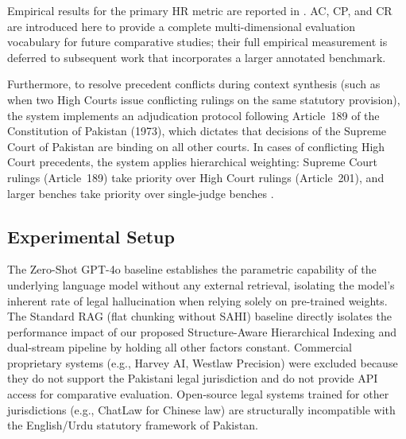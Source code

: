 Empirical results for the primary HR metric are reported in . AC, CP,
and CR are introduced here to provide a complete multi-dimensional evaluation vocabulary
for future comparative studies; their full empirical measurement is deferred to
subsequent work that incorporates a larger annotated benchmark.

Furthermore, to resolve precedent conflicts during context synthesis (such as when two High Courts issue conflicting rulings on the same statutory provision), the system
implements an adjudication protocol following Article~189 of the Constitution of
Pakistan (1973), which dictates that decisions of the Supreme Court of Pakistan are
binding on all other courts. In cases of conflicting High Court precedents, the system
applies hierarchical weighting: Supreme Court rulings (Article~189) take priority over
High Court rulings (Article~201), and larger benches take priority over single-judge
benches \cite{r605}.

\subsection{Experimental Setup}
\label{subsec:setup}

 The
Zero-Shot GPT-4o baseline establishes the parametric capability of the underlying
language model without any external retrieval, isolating the model's inherent rate of
legal hallucination when relying solely on pre-trained weights. The Standard RAG (flat
chunking without SAHI) baseline directly isolates the performance impact of our proposed
Structure-Aware Hierarchical Indexing and dual-stream pipeline by holding all other
factors constant. Commercial proprietary systems (e.g., Harvey AI, Westlaw Precision)
were excluded because they do not support the Pakistani legal jurisdiction and do not
provide API access for comparative evaluation. Open-source legal systems trained for
other jurisdictions (e.g., ChatLaw for Chinese law) are structurally incompatible with
the English/Urdu statutory framework of Pakistan.

